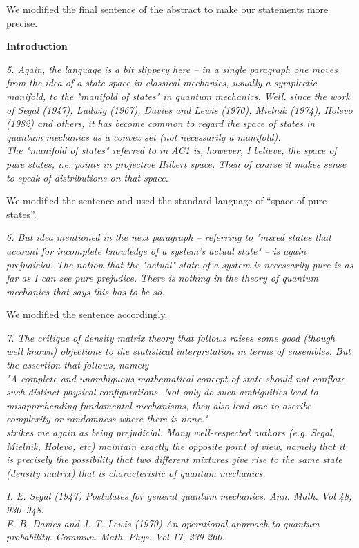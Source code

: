 \documentclass{article}
\newcommand{\REVIEW}[1]{{ \it \textcolor{reviewblack}{#1}}}
\newcommand{\REPLY}[1]{\textcolor{UCDBlue}{#1}}
\begin{document}
\REPLY{We modified the final sentence of the abstract to make our statements more precise.}

{\bf Introduction}


\REVIEW{5. Again, the language is a bit slippery here -- in a single paragraph one moves from the idea of a state space in classical mechanics, usually a symplectic manifold, to the "manifold of states" in quantum mechanics. Well, since the work of Segal (1947), Ludwig (1967), Davies and Lewis (1970), Mielnik (1974), Holevo (1982) and others, it has become common to regard the space of states in quantum mechanics as a convex set (not necessarily a manifold).}\\
\REVIEW{The "manifold of states" referred to in AC1 is, however, I believe, the space of pure states, i.e. points in projective Hilbert space. Then of course it makes sense to speak of distributions on that space.}

\REPLY{We modified the sentence and used the standard language of ``space of pure states''.}

\REVIEW{6. But idea mentioned in the next paragraph -- referring to "mixed states that account for incomplete knowledge of a system’s actual state" -- is again prejudicial. The notion that the "actual" state of a system is necessarily pure is as far as I can see pure prejudice. There is nothing in the theory of quantum mechanics that says this has to be so.
}

\REPLY{We modified the sentence accordingly.}

\REVIEW{7. The critique of density matrix theory that follows raises some good (though well known) objections to the statistical interpretation in terms of ensembles. But the assertion that follows, namely}\\
\REVIEW{"A complete and unambiguous mathematical concept of state should not conflate such distinct physical configurations. Not only do such ambiguities lead to misapprehending fundamental mechanisms, they also lead one to ascribe complexity or randomness where there is none."}\\
\REVIEW{strikes me again as being prejudicial. Many well-respected authors (e.g. Segal, Mielnik, Holevo, etc) maintain exactly the opposite point of view, namely that it is precisely the possibility that two different mixtures give rise to the same state (density matrix) that is characteristic of quantum mechanics.}

\REVIEW{I. E. Segal (1947) Postulates for general quantum mechanics. Ann. Math. Vol 48, 930–948.}\\
\REVIEW{E. B. Davies and J. T. Lewis (1970) An operational approach to quantum probability. Commun. Math. Phys. Vol 17, 239-260.}\\
\end{document}

